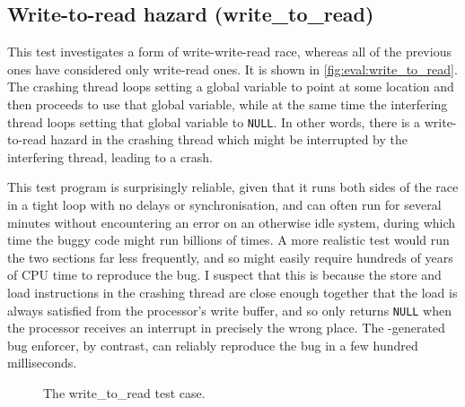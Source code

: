 \subsection{Write-to-read hazard (write\_to\_read)}


This test investigates a form of write-write-read race, whereas all of
the previous ones have considered only write-read ones.  It is shown
in \autoref{fig:eval:write_to_read}.  The crashing thread loops
setting a global variable to point at some location and then proceeds
to use that global variable, while at the same time the interfering
thread loops setting that global variable to \texttt{NULL}.  In other
words, there is a write-to-read hazard in the crashing thread which
might be interrupted by the interfering thread, leading to a crash.

This test program is surprisingly reliable, given that it runs both
sides of the race in a tight loop with no delays or synchronisation,
and can often run for several minutes without encountering an error on
an otherwise idle system, during which time the buggy code might run
billions of times.  A more realistic test would run the two sections
far less frequently, and so might easily require hundreds of years of
CPU time to reproduce the bug.  I suspect that this is because the
store and load instructions in the crashing thread are close enough
together that the load is always satisfied from the processor's write
buffer, and so only returns \texttt{NULL} when the processor receives
an interrupt in precisely the wrong place.  The {\technique}-generated
bug enforcer, by contrast, can reliably reproduce the bug in a few
hundred milliseconds.

\begin{figure}
  \centerline{
    {\hfill}
  \hfill
    {\hfill}
    }
  \caption{The write\_to\_read test case.}
  \label{fig:eval:write_to_read}
\end{figure}

